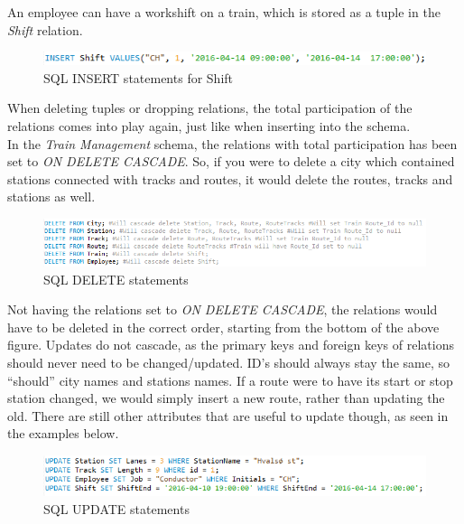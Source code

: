 An employee can have a workshift on a train, which is stored as a tuple in the 
\emph{Shift} relation.

\begin{figure}[ht!]
    \centering
    \includegraphics[width=.9\textwidth]{img/INSERT_Statements_Shift}
    \caption{SQL INSERT statements for Shift}
\end{figure}

When deleting tuples or dropping relations, the total participation of the 
relations comes into play again, just like when inserting into the schema.\\
In the \emph{Train Management} schema, the relations with total participation 
has been set to \emph{ON DELETE CASCADE}. So, if you were to delete a city 
which contained stations connected with tracks and routes, it would delete the 
routes, tracks and stations as well.\\

\begin{figure}[ht!]
    \centering
    \includegraphics[width=1\textwidth]{img/DELETE_Statements}
    \caption{SQL DELETE statements}
\end{figure}

Not having the relations set to \emph{ON DELETE CASCADE}, the relations would 
have to be deleted in the correct order, starting from the bottom of the above 
figure.
Updates do not cascade, as the primary keys and foreign keys of relations 
should never need to be changed/updated. ID's should always stay the same, so 
``should'' city names and stations names. If a route were to have its start or 
stop station changed, we would simply insert a new route, rather than updating 
the old.
There are still other attributes that are useful to update though, as seen in 
the examples below.

\begin{figure}[ht!]
    \centering
    \includegraphics[width=1\textwidth]{img/UPDATE_Statements}
    \caption{SQL UPDATE statements}
\end{figure}

